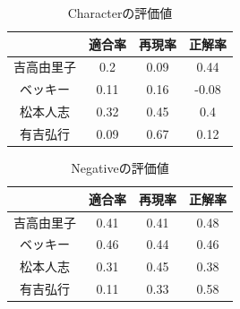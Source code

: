 \documentclass[dvipdfmx]{issj}
\begin{document}
\begin{table}[t]
  \begin{center}
    \caption{Characterの評価値}
    \begin{tabular}{c|ccc} \hline \hline
& 適合率 & 再現率 & 正解率 \\ \hline \hline
吉高由里子 &0.2&0.09&0.44 \\ \hline
ベッキー &0.11&0.16&-0.08\\ \hline
松本人志 &0.32&0.45&0.4\\ \hline
有吉弘行 & 0.09&0.67&0.12 \\ \hline
    \end{tabular}
    \label{tab:tripcode_user}
  \end{center}
\end{table}


\begin{table}[t]
  \begin{center}
    \caption{Negativeの評価値}
    \begin{tabular}{c|ccc} \hline \hline
& 適合率 & 再現率 & 正解率 \\ \hline \hline
吉高由里子 &0.41&0.41&0.48 \\ \hline
ベッキー &0.46&0.44&0.46\\ \hline
松本人志 &0.31&0.45&0.38\\ \hline
有吉弘行 & 0.11&0.33&0.58 \\ \hline
    \end{tabular}
    \label{tab:tripcode_user}
  \end{center}
\end{table}





\end{document}
